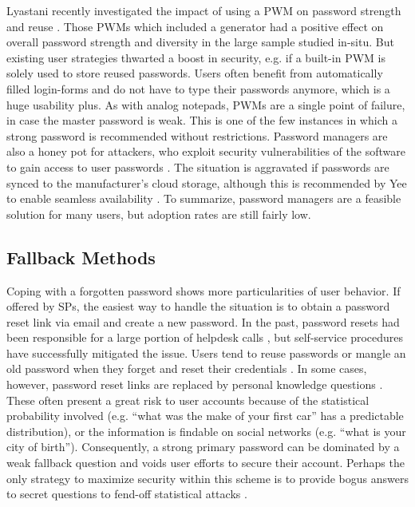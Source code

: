 	Lyastani \etal recently investigated the impact of using a PWM on password strength and reuse \cite{Lyastani2017ImpactPWMPasswordStrength}. Those \glspl{PWM} which included a generator had a positive effect on overall password strength and diversity in the large sample studied in-situ. But existing user strategies thwarted a boost in security, e.g. if a built-in \gls{PWM} is solely used to store reused passwords. Users often benefit from automatically filled login-forms and do not have to type their passwords anymore, which is a huge usability plus. As with analog notepads, PWMs are a single point of failure, in case the master password is weak. This is one of the few instances in which a strong password is recommended without restrictions. Password managers are also a honey pot for attackers, who exploit security vulnerabilities of the software to gain access to user passwords \cite{Bonneau2012ReplacePasswords}. The situation is aggravated if passwords are synced to the manufacturer's cloud storage, although this is recommended by Yee to enable seamless availability \cite{Yee2006Passpet}. To summarize, password managers are a feasible solution for many users, but adoption rates are still fairly low. 

	\subsection{Fallback Methods}
	Coping with a forgotten password shows more particularities of user behavior. If offered by \glspl{SP}, the easiest way to handle the situation is to obtain a password reset link via email and create a new password. In the past, password resets had been responsible for a large portion of helpdesk calls \cite{Sasse2001WeakestLink}, but self-service procedures have successfully mitigated the issue. Users tend to reuse passwords or mangle an old password when they forget and reset their credentials \cite{Stobert2014PasswordLifeCycle}. In some cases, however, password reset links are replaced by personal knowledge questions \cite{Bonneau2015SecretsLies}. These often present a great risk to user accounts because of the statistical probability involved (e.g. ``what was the make of your first car'' has a predictable distribution), or the information is findable on social networks (e.g. ``what is your city of birth''). Consequently, a strong primary password can be dominated by a weak fallback question and voids user efforts to secure their account. Perhaps the only strategy to maximize security within this scheme is to provide bogus answers to secret questions to fend-off statistical attacks . 

